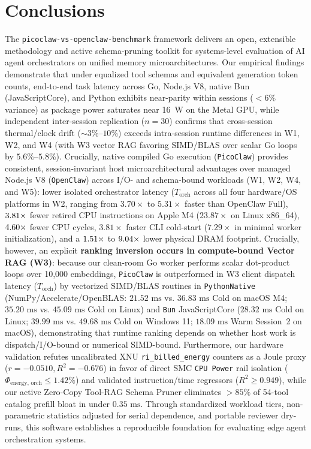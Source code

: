 \documentclass[11pt,a4paper]{article}
\begin{document}
\section{Conclusions}
\label{sec:conclusions}
The \texttt{picoclaw-vs-openclaw-benchmark} framework delivers an open, extensible methodology and active schema-pruning toolkit for systems-level evaluation of AI agent orchestrators on unified memory microarchitectures. Our empirical findings demonstrate that under equalized tool schemas and equivalent generation token counts, end-to-end task latency across Go, Node.js V8, native Bun (JavaScriptCore), and Python exhibits near-parity within sessions ($< 6\%$ variance) as package power saturates near 16~W on the Metal GPU, while independent inter-session replication ($n=30$) confirms that cross-session thermal/clock drift ($\sim 3\%\text{--}10\%$) exceeds intra-session runtime differences in W1, W2, and W4 (with W3 vector RAG favoring SIMD/BLAS over scalar Go loops by $5.6\%\text{--}5.8\%$). Crucially, native compiled Go execution (\texttt{PicoClaw}) provides consistent, session-invariant host microarchitectural advantages over managed Node.js V8 (\texttt{OpenClaw}) across I/O- and schema-bound workloads (W1, W2, W4, and W5): lower isolated orchestrator latency ($T_{\text{orch}}$ across all four hardware/OS platforms in W2, ranging from $3.70\times$ to $5.31\times$ faster than OpenClaw Full), $3.81\times$ fewer retired CPU instructions on Apple M4 ($23.87\times$ on Linux x86\_64), $4.60\times$ fewer CPU cycles, $3.81\times$ faster CLI cold-start ($7.29\times$ in minimal worker initialization), and a $1.51\times$ to $9.04\times$ lower physical DRAM footprint. Crucially, however, an explicit \textbf{ranking inversion occurs in compute-bound Vector RAG (W3)}: because our clean-room Go worker performs scalar dot-product loops over 10,000 embeddings, \texttt{PicoClaw} is outperformed in W3 client dispatch latency ($T_{\text{orch}}$) by vectorized SIMD/BLAS routines in \texttt{PythonNative} (NumPy/Accelerate/OpenBLAS: $21.52\text{ ms}$ vs. $36.83\text{ ms}$ Cold on macOS M4; $35.20\text{ ms}$ vs. $45.09\text{ ms}$ Cold on Linux) and \texttt{Bun} JavaScriptCore ($28.32\text{ ms}$ Cold on Linux; $39.99\text{ ms}$ vs. $49.68\text{ ms}$ Cold on Windows 11; $18.09\text{ ms}$ Warm Session~2 on macOS), demonstrating that runtime ranking depends on whether host work is dispatch/I/O-bound or numerical SIMD-bound. Furthermore, our hardware validation refutes uncalibrated XNU \texttt{ri\_billed\_energy} counters as a Joule proxy ($r = -0.0510, R^2 = -0.676$) in favor of direct SMC \texttt{CPU Power} rail isolation ($\Phi_{\text{energy, orch}} \le 1.42\%$) and validated instruction/time regressors ($R^2 \ge 0.949$), while our active Zero-Copy Tool-RAG Schema Pruner eliminates $>85\%$ of 54-tool catalog prefill bloat in under $0.35\text{ ms}$. Through standardized workload tiers, non-parametric statistics adjusted for serial dependence, and portable reviewer dry-runs, this software establishes a reproducible foundation for evaluating edge agent orchestration systems.
\end{document}
